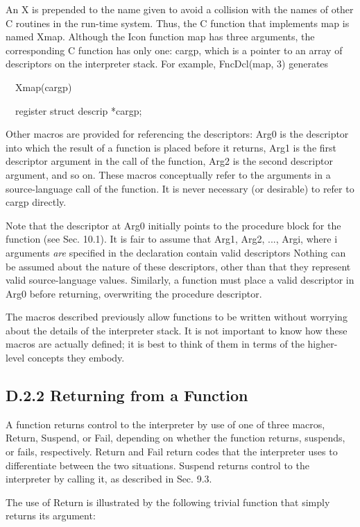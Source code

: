 An X is prepended to the name given to avoid a collision with the
names of other C routines in the run-time system.  Thus, the C
function that implements map is named Xmap. Although the Icon function
map has three arguments, the corresponding C function has only one:
cargp, which is a pointer to an array of descriptors on the
interpreter stack.  For example, FncDcl(map, 3) generates

{\ttfamily\mdseries
\ \ Xmap(cargp)}

{\ttfamily\mdseries
\ \ register struct descrip *cargp;}


Other macros are provided for referencing the descriptors: Arg0 is the descriptor into which the result of a function is
placed before it returns, Arg1 is the first descriptor argument in the call of the function, Arg2 is the second
descriptor argument, and so on. These macros conceptually refer to the arguments in a source-language call of the
function. It is never necessary (or desirable) to refer to cargp directly.


Note that the descriptor at Arg0 initially points to the procedure
block for the function (see Sec. 10.1). It is fair to assume that
Arg1, Arg2, ..., Argi, where i arguments \textit{are} specified in the
declaration contain valid descriptors Nothing can be assumed about the
nature of these descriptors, other than that they represent valid
source-language values. Similarly, a function must place a valid
descriptor in Arg0 before returning, overwriting the procedure
descriptor.

The macros described previously allow functions to be written without
worrying about the details of the interpreter stack. It is not
important to know how these macros are actually defined; it is best to
think of them in terms of the higher-level concepts they embody.

\subsection[D.2.2 Returning from a Function]{D.2.2 Returning from a Function}

A function returns control to the interpreter by use of one of three
macros, Return, Suspend, or Fail, depending on whether the function
returns, suspends, or fails, respectively. Return and Fail return
codes that the interpreter uses to differentiate between the two
situations. Suspend returns control to the interpreter by calling it,
as described in Sec. 9.3.

The use of Return is illustrated by the following trivial function
that simply returns its argument:

